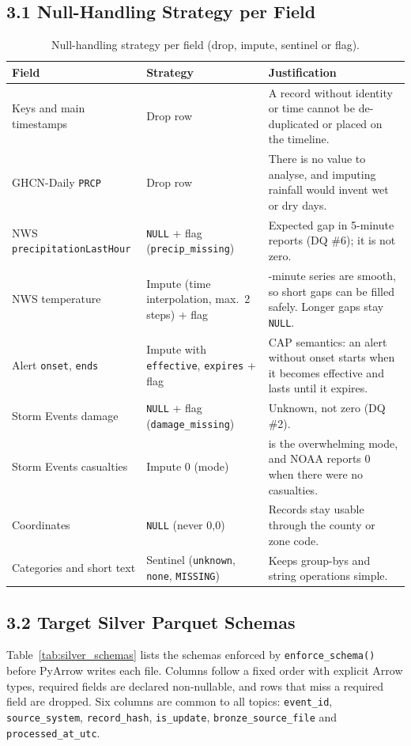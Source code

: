 \documentclass[stu, 12pt, letterpaper, donotrepeattitle, floatsintext, natbib]{apa7}
\begin{document}
\subsection{3.1 Null-Handling Strategy per Field}
\begin{table}[H]
\centering
\footnotesize
\caption{Null-handling strategy per field (drop, impute, sentinel or flag).}
\label{tab:nulls}
\begin{tabularx}{\textwidth}{>{\raggedright\arraybackslash}p{3.8cm} >{\raggedright\arraybackslash}p{3.4cm} >{\raggedright\arraybackslash}X}
\toprule
\textbf{Field} & \textbf{Strategy} & \textbf{Justification} \\
\midrule
Keys and main timestamps & Drop row & A record without identity or time cannot be de-duplicated or placed on the timeline. \\
GHCN-Daily \texttt{PRCP} & Drop row & There is no value to analyse, and imputing rainfall would invent wet or dry days. \\
NWS \texttt{precipitationLastHour} & \texttt{NULL} + flag (\texttt{precip\_missing}) & Expected gap in 5-minute reports (DQ \#6); it is not zero. \\
NWS temperature & Impute (time interpolation, max.\ 2 steps) + flag & 5-minute series are smooth, so short gaps can be filled safely. Longer gaps stay \texttt{NULL}. \\
Alert \texttt{onset}, \texttt{ends} & Impute with \texttt{effective}, \texttt{expires} + flag & CAP semantics: an alert without onset starts when it becomes effective and lasts until it expires. \\
Storm Events damage & \texttt{NULL} + flag (\texttt{damage\_missing}) & Unknown, not zero (DQ \#2). \\
Storm Events casualties & Impute 0 (mode) & 0 is the overwhelming mode, and NOAA reports 0 when there were no casualties. \\
Coordinates & \texttt{NULL} (never 0,0) & Records stay usable through the county or zone code. \\
Categories and short text & Sentinel (\texttt{unknown}, \texttt{none}, \texttt{MISSING}) & Keeps group-bys and string operations simple. \\
\bottomrule
\end{tabularx}
\end{table}

\subsection{3.2 Target Silver Parquet Schemas}
Table~\ref{tab:silver_schemas} lists the schemas enforced by \texttt{enforce\_schema()} before PyArrow writes each file. Columns follow a fixed order with explicit Arrow types, required fields are declared non-nullable, and rows that miss a required field are dropped. Six columns are common to all topics: \texttt{event\_id}, \texttt{source\_system}, \texttt{record\_hash}, \texttt{is\_update}, \texttt{bronze\_source\_file} and \texttt{processed\_at\_utc}.
\end{document}
